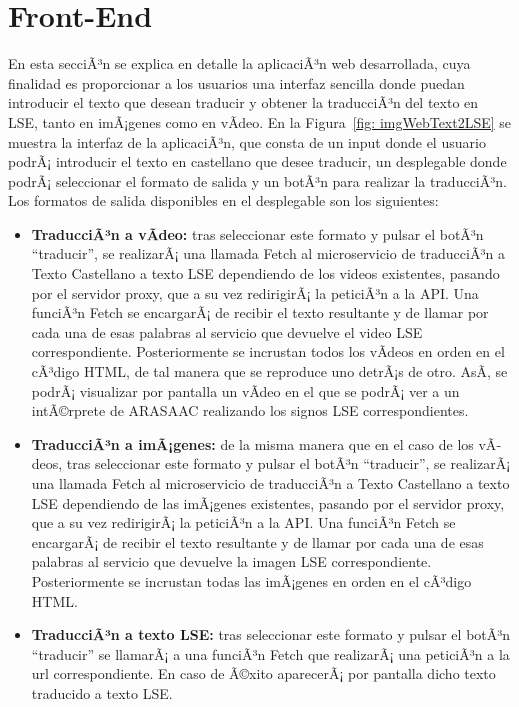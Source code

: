 \section{Front-End}

En esta secciÃ³n se explica en detalle la aplicaciÃ³n web desarrollada, cuya finalidad es proporcionar a los usuarios una interfaz sencilla donde puedan introducir el texto que desean traducir y obtener la traducciÃ³n del texto en LSE, tanto en imÃ¡genes como en vÃ­deo. En la  Figura~\ref {fig: imgWebText2LSE} se muestra la interfaz de la aplicaciÃ³n, que consta de un input donde el usuario podrÃ¡ introducir el texto en castellano que desee traducir, un desplegable donde podrÃ¡ seleccionar el formato de salida y un botÃ³n para realizar la traducciÃ³n.\\

Los formatos de salida disponibles en el desplegable son los siguientes:

\begin{itemize}

	\item \textbf{TraducciÃ³n a vÃ­deo:} tras seleccionar este formato y pulsar el botÃ³n ``traducir'', se realizarÃ¡ una llamada Fetch al microservicio de traducciÃ³n a Texto Castellano a texto LSE dependiendo de los videos existentes, pasando por el servidor proxy, que a su vez redirigirÃ¡ la peticiÃ³n a la API. Una funciÃ³n Fetch se encargarÃ¡ de recibir el texto resultante y de llamar por cada una de esas palabras al servicio que devuelve el video LSE correspondiente. Posteriormente se incrustan todos los vÃ­deos en orden en el cÃ³digo HTML, de tal manera que se reproduce uno detrÃ¡s de otro. AsÃ­, se podrÃ¡ visualizar por pantalla un vÃ­deo en el que se podrÃ¡ ver a un intÃ©rprete de ARASAAC realizando los signos LSE correspondientes.
	
	\item \textbf{TraducciÃ³n a imÃ¡genes:} de la misma manera que en el caso de los vÃ­deos, tras seleccionar este formato y pulsar el botÃ³n ``traducir'', se realizarÃ¡ una llamada Fetch  al microservicio de traducciÃ³n a Texto Castellano a texto LSE dependiendo de las imÃ¡genes existentes, pasando por el servidor proxy, que a su vez redirigirÃ¡ la peticiÃ³n a la API. Una funciÃ³n Fetch se encargarÃ¡ de recibir el texto resultante y de llamar por cada una de esas palabras al servicio que devuelve la imagen LSE correspondiente. Posteriormente se incrustan todas las imÃ¡genes en orden en el cÃ³digo HTML. 

	\item \textbf{TraducciÃ³n a texto LSE:} tras seleccionar este formato y pulsar el botÃ³n ``traducir'' se llamarÃ¡ a una funciÃ³n Fetch que realizarÃ¡ una peticiÃ³n a la url correspondiente. En caso de Ã©xito aparecerÃ¡ por pantalla dicho texto traducido a texto LSE.

\end{itemize}


